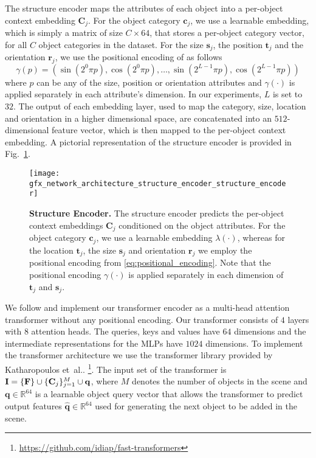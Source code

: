 \documentclass{article}
\makeatletter
\newcommand{\bc}{\mathbf{c}}\newcommand{\bC}{\mathbf{C}}
\newcommand{\bq}{\mathbf{q}}\newcommand{\bQ}{\mathbf{Q}}
\newcommand{\br}{\mathbf{r}}\newcommand{\bR}{\mathbf{R}}
\newcommand{\bs}{\mathbf{s}}\newcommand{\bS}{\mathbf{S}}
\newcommand{\bt}{\mathbf{t}}\newcommand{\bT}{\mathbf{T}}
\DeclareRobustCommand\onedot{\futurelet\@let@token\@onedot}
\def\@onedot{\ifx\@let@token.\else.\null\fi\xspace}
\def\etal{et~al\onedot}
\newcommand{\boldparagraph}[1]{\vspace{0.2cm}\noindent{\bf #1:} }
\newcommand{\figref}[1]{Fig.~\ref{#1}}
\makeatother
\begin{document}
\boldparagraph{Structure Encoder}The structure encoder maps the attributes of each object into a per-object
context embedding $\bC_j$. For the object category $\bc_j$, we use a learnable
embedding, which is simply a matrix of size $C \times 64$, that stores a
per-object category vector, for all $C$ object categories in the dataset. 
For the size $\bs_j$, the position $\bt_j$ and the orientation
$\br_j$, we use the positional encoding of \cite{Vaswani2017NIPS} as follows
\begin{equation}
    \gamma(p) = (\sin(2^0\pi p), \cos(2^0\pi p), \dots, \sin(2^{L-1}\pi p), \cos(2^{L-1}\pi p))
    \label{eq:positional_encoding}
\end{equation}
where $p$ can be any of the size, position or orientation attributes and
$\gamma(\cdot)$ is applied separately in each attribute's dimension. In our
experiments, $L$ is set to $32$. The output of each embedding layer, used to map the
category, size, location and orientation in a higher dimensional space, are
concatenated into an $512$-dimensional feature vector, which is then mapped
to the per-object context embedding.
A pictorial representation
of the structure encoder is provided in \figref{fig:structure_encoder}.
\begin{figure}
    \centering
    \texttt{[image: gfx\_network\_architecture\_structure\_encoder\_structure\_encoder]}
    \caption{{\bf{Structure Encoder.}} The structure encoder predicts the
    per-object context embeddings $\bC_j$ conditioned on the object attributes.
    For the object category $\bc_j$, we use a learnable embedding
    $\lambda(\cdot)$, whereas for the location $\bt_j$, the size $\bs_j$ and
    orientation $\br_j$ we employ the positional encoding from
    \eqref{eq:positional_encoding}.
    Note that the positional encoding $\gamma(\cdot)$ is applied separately in
    each dimension of $\bt_j$ and $\bs_j$.}
    \label{fig:structure_encoder}
    \vspace{-0.8em}
\end{figure}

\boldparagraph{Transformer Encoder}We follow \cite{Vaswani2017NIPS, Devlin2019NAACL} and implement our transformer 
encoder as a multi-head attention transformer without any positional
encoding. Our transformer consists of $4$ layers with $8$ attention heads. The
queries, keys and values have $64$ dimensions and the intermediate
representations for the MLPs have $1024$ dimensions. To implement the
transformer architecture we use the transformer library provided by Katharopoulos \etal
\cite{Katharopoulos2020ICML}\footnote{\href{https://github.com/idiap/fast-transformers}{https://github.com/idiap/fast-transformers}}.
The input set of the transformer is $\bI=\{\bF\}\cup\{\bC_j\}_{j=1}^M \cup{\bq}$, where $M$ denotes the number of
objects in the scene and $\bq \in \mathbb{R}^{64}$ is a learnable object
query vector that allows the transformer to predict output features
$\hat{\bq} \in \mathbb{R}^{64}$ used for generating the next object to be added
in the scene.
\end{document}
